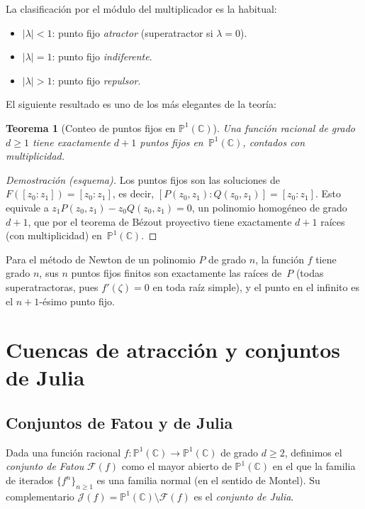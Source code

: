 \documentclass[11pt,a4paper]{article}
\theoremstyle{plain}
\newtheorem{teorema}{Teorema}[section]
\theoremstyle{definition}
\theoremstyle{remark}
\newcommand{\Puno}{\mathbb{P}^1(\mathbb{C})}
\begin{document}
La clasificación por el módulo del multiplicador es la habitual:
\begin{itemize}
  \item $|\lambda|<1$: punto fijo \emph{atractor} (superatractor si $\lambda=0$).
  \item $|\lambda|=1$: punto fijo \emph{indiferente}.
  \item $|\lambda|>1$: punto fijo \emph{repulsor}.
\end{itemize}

El siguiente resultado es uno de los más elegantes de la teoría:

\begin{teorema}[Conteo de puntos fijos en $\Puno$]
\label{teo:puntosfijos}
Una función racional de grado $d\geq 1$ tiene exactamente $d+1$
puntos fijos en~$\Puno$, contados con multiplicidad.
\end{teorema}

\begin{proof}[Demostración (esquema)]
Los puntos fijos son las soluciones de $F([z_0:z_1])=[z_0:z_1]$,
es decir, $[P(z_0,z_1):Q(z_0,z_1)]=[z_0:z_1]$.
Esto equivale a $z_1 P(z_0,z_1)-z_0 Q(z_0,z_1)=0$, un polinomio
homogéneo de grado $d+1$, que por el teorema de Bézout proyectivo
tiene exactamente $d+1$ raíces (con multiplicidad) en~$\Puno$.
\end{proof}

Para el método de Newton de un polinomio $P$ de grado $n$, la función
$f$ tiene grado $n$, sus $n$ puntos fijos finitos son exactamente
las raíces de~$P$ (todas superatractoras, pues $f'(\zeta)=0$ en toda
raíz simple), y el punto en el infinito es el $n+1$-ésimo punto fijo.

\section{Cuencas de atracción y conjuntos de Julia}
\label{sec:cuencas}

\subsection{Conjuntos de Fatou y de Julia}

Dada una función racional $f:\Puno\to\Puno$ de grado $d\geq 2$,
definimos el \emph{conjunto de Fatou} $\mathcal{F}(f)$ como el mayor
abierto de $\Puno$ en el que la familia de iterados
$\{f^n\}_{n\geq 1}$ es una familia normal (en el sentido de Montel).
Su complementario $\mathcal{J}(f)=\Puno\setminus\mathcal{F}(f)$ es el
\emph{conjunto de Julia}.
\end{document}
